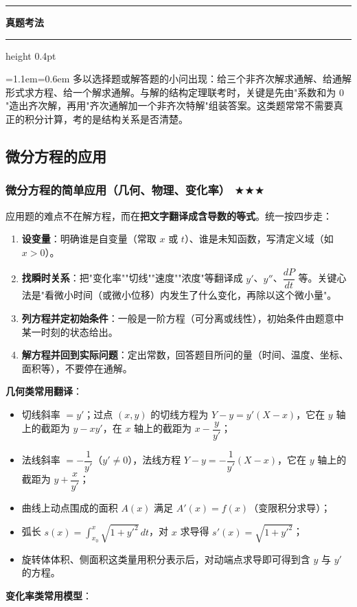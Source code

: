 \documentclass[11pt,openany,UTF8]{ctexbook}
\newcommand{\callouthead}[2]{%
  \par\addvspace{7pt}\noindent
  {\color{#1}\rule[-0.15em]{3pt}{1.05em}}\hspace{0.5em}%
  {\bfseries\color{#1}#2}\par\nobreak\vspace{-0.35em}%
  {\color{rulesep}\hrule height 0.4pt}\nobreak\vspace{0.45em}%
  \begingroup\small\setlength{\parindent}{0pt}%
  \leftskip=1.1em\rightskip=0.6em\noindent\ignorespaces}
\newcommand{\calloutend}{\par\endgroup\addvspace{7pt}}
\newenvironment{callexam}[1]{\callouthead{exambar}{#1}}{\calloutend}
\begin{document}
\begin{callexam}{真题考法}
多以选择题或解答题的小问出现：给三个非齐次解求通解、给通解形式求方程、给一个解求通解。与解的结构定理联考时，关键是先由"系数和为 $0$"造出齐次解，再用"齐次通解加一个非齐次特解"组装答案。这类题常常不需要真正的积分计算，考的是结构关系是否清楚。

\end{callexam}

\subsection{微分方程的应用}

\subsubsection{微分方程的简单应用（几何、物理、变化率） $\bigstar$$\bigstar$$\bigstar$}

应用题的难点不在解方程，而在\textbf{把文字翻译成含导数的等式}。统一按四步走：

\begin{enumerate}
\item \textbf{设变量}：明确谁是自变量（常取 $x$ 或 $t$）、谁是未知函数，写清定义域（如 $x>0$）。
\item \textbf{找瞬时关系}：把"变化率""切线""速度""浓度"等翻译成 $y'$、$y''$、$\dfrac{dP}{dt}$ 等。关键心法是"看微小时间（或微小位移）内发生了什么变化，再除以这个微小量"。
\item \textbf{列方程并定初始条件}：一般是一阶方程（可分离或线性），初始条件由题意中某一时刻的状态给出。
\item \textbf{解方程并回到实际问题}：定出常数，回答题目所问的量（时间、温度、坐标、面积等），不要停在通解。
\end{enumerate}
\textbf{几何类常用翻译}：

\begin{itemize}
\item 切线斜率 $=y'$；过点 $(x,y)$ 的切线方程为 $Y-y=y'(X-x)$，它在 $y$ 轴上的截距为 $y-xy'$，在 $x$ 轴上的截距为 $x-\dfrac{y}{y'}$；
\item 法线斜率 $=-\dfrac{1}{y'}$（$y'\ne 0$），法线方程 $Y-y=-\dfrac1{y'}(X-x)$，它在 $y$ 轴上的截距为 $y+\dfrac{x}{y'}$；
\item 曲线上动点围成的面积 $A(x)$ 满足 $A'(x)=f(x)$（变限积分求导）；
\item 弧长 $s(x)=\displaystyle\int_{x_0}^{x}\sqrt{1+y'^{2}}\,dt$，对 $x$ 求导得 $s'(x)=\sqrt{1+y'^{2}}$；
\item 旋转体体积、侧面积这类量用积分表示后，对动端点求导即可得到含 $y$ 与 $y'$ 的方程。
\end{itemize}
\textbf{变化率类常用模型}：
\end{document}
